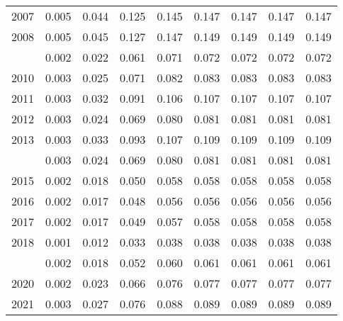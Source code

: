 \documentclass[
]{article}
\begin{document}
\begin{longtable}[t]{lrrrrrrrr}
2007 & 0.005 & 0.044 & 0.125 & 0.145 & 0.147 & 0.147 & 0.147 & 0.147\\
2008 & 0.005 & 0.045 & 0.127 & 0.147 & 0.149 & 0.149 & 0.149 & 0.149\\
\addlinespace
2009 & 0.002 & 0.022 & 0.061 & 0.071 & 0.072 & 0.072 & 0.072 & 0.072\\
2010 & 0.003 & 0.025 & 0.071 & 0.082 & 0.083 & 0.083 & 0.083 & 0.083\\
2011 & 0.003 & 0.032 & 0.091 & 0.106 & 0.107 & 0.107 & 0.107 & 0.107\\
2012 & 0.003 & 0.024 & 0.069 & 0.080 & 0.081 & 0.081 & 0.081 & 0.081\\
2013 & 0.003 & 0.033 & 0.093 & 0.107 & 0.109 & 0.109 & 0.109 & 0.109\\
\addlinespace
2014 & 0.003 & 0.024 & 0.069 & 0.080 & 0.081 & 0.081 & 0.081 & 0.081\\
2015 & 0.002 & 0.018 & 0.050 & 0.058 & 0.058 & 0.058 & 0.058 & 0.058\\
2016 & 0.002 & 0.017 & 0.048 & 0.056 & 0.056 & 0.056 & 0.056 & 0.056\\
2017 & 0.002 & 0.017 & 0.049 & 0.057 & 0.058 & 0.058 & 0.058 & 0.058\\
2018 & 0.001 & 0.012 & 0.033 & 0.038 & 0.038 & 0.038 & 0.038 & 0.038\\
\addlinespace
2019 & 0.002 & 0.018 & 0.052 & 0.060 & 0.061 & 0.061 & 0.061 & 0.061\\
2020 & 0.002 & 0.023 & 0.066 & 0.076 & 0.077 & 0.077 & 0.077 & 0.077\\
2021 & 0.003 & 0.027 & 0.076 & 0.088 & 0.089 & 0.089 & 0.089 & 0.089\\*
\end{longtable}
\end{document}
